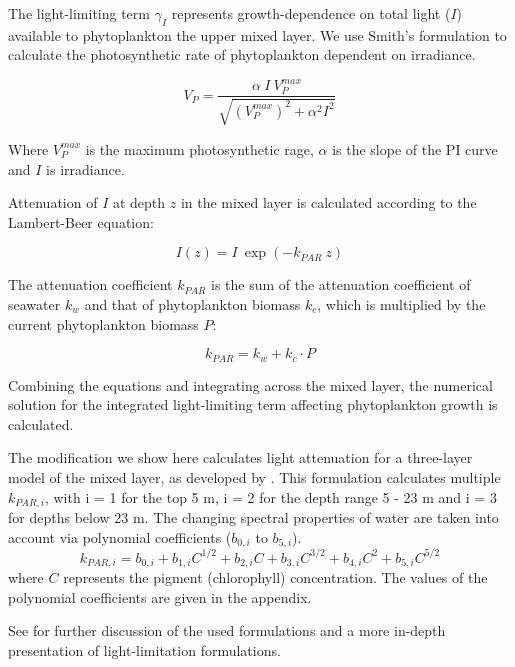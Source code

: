 \documentclass[journal abbreviation, manuscript]{copernicus}
\begin{document}
The light-limiting term $\gamma_{I}$ represents growth-dependence on total light ($I$) available to phytoplankton the upper mixed layer. We use Smith's formulation to calculate the photosynthetic rate of phytoplankton dependent on irradiance.

\begin{equation}
    V_P = \frac{\alpha ~ I ~ V_P^{max}}{\sqrt{(V_P^{max})^2 + \alpha^2 I^2}}
\end{equation}

Where $V_P^{max}$ is the maximum photosynthetic rage, $\alpha$ is the slope of the PI curve and $I$ is irradiance.

Attenuation of $I$ at depth $z$ in the mixed layer is calculated according to the Lambert-Beer equation:

\begin{equation}
    I(z) = I \ \exp{(-k_{PAR} \ z)}
\end{equation}

The attenuation coefficient $k_{PAR}$ is the sum of the attenuation coefficient of seawater $k_w$ and that of phytoplankton biomass $k_c$, which is multiplied by the current phytoplankton biomass $P$:

\begin{equation}
    k_{PAR} = k_w + k_c \cdot P
\end{equation}

Combining the equations and integrating across the mixed layer, the numerical solution for the integrated light-limiting term affecting phytoplankton growth is calculated.

The modification we show here calculates light attenuation for a three-layer model of the mixed layer, as developed by \citet{Anderson1993APhotosynthesis}. This formulation calculates multiple $k_{PAR, i}$, with i = 1 for the top 5 \unit{m}, i = 2 for the depth range 5 - 23 \unit{m} and i = 3 for depths below 23 \unit{m}. The changing spectral properties of water are taken into account via polynomial coefficients ($b_{0,i}$ to $b_{5,i}$).
\begin{equation}
    k_{PAR, i} = b_{0,i} + b_{1,i} C^{1/2} + b_{2,i} C + b_{3,i} C^{3/2} + b_{4,i} C^2 + b_{5,i} C^{5/2}
\end{equation}
where $C$ represents the pigment (chlorophyll) concentration. The values of the polynomial coefficients are given in the appendix.

See \citet{Anderson2015c} for further discussion of the used formulations and a more in-depth presentation of light-limitation formulations.
\end{document}
